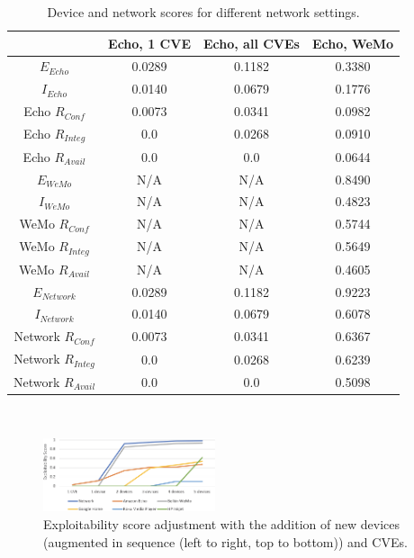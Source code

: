 \begin{table}[t]
    \centering
    \begin{tabular}{| c | c | c | c |}
    \toprule
    {} & Echo, 1 CVE & Echo, all CVEs & Echo, WeMo \\
    \midrule
    $E_{Echo}$ & 0.0289 & 0.1182 & 0.3380 \\
    $I_{Echo}$ & 0.0140 & 0.0679 & 0.1776 \\
    Echo $R_{Conf}$ & 0.0073 & 0.0341 & 0.0982 \\
    Echo $R_{Integ}$ & 0.0 & 0.0268 & 0.0910 \\
    Echo $R_{Avail}$ & 0.0 & 0.0 & 0.0644 \\
    \midrule
    $E_{WeMo}$ & N/A & N/A & 0.8490 \\
    $I_{WeMo}$ & N/A & N/A & 0.4823 \\
    WeMo $R_{Conf}$ & N/A & N/A & 0.5744 \\
    WeMo $R_{Integ}$ & N/A & N/A & 0.5649 \\
    WeMo $R_{Avail}$ & N/A & N/A & 0.4605 \\
    \midrule
    $E_{Network}$ & 0.0289 & 0.1182 & 0.9223 \\
    $I_{Network}$ & 0.0140 & 0.0679 & 0.6078 \\
    Network $R_{Conf}$ & 0.0073 & 0.0341 & 0.6367 \\
    Network $R_{Integ}$ & 0.0 & 0.0268 & 0.6239 \\
    Network $R_{Avail}$ & 0.0 & 0.0 & 0.5098 \\
    \bottomrule
    \end{tabular}
    \\
    \caption{Device and network scores for different network settings.}
    \label{tab:results}
\end{table}

\begin{figure}[t]
    \centering
    \includegraphics[width=0.45\textwidth]{exploitability_trends.png}
    \caption{Exploitability score adjustment with the addition of new devices (augmented in sequence (left to right, top to bottom)) and CVEs.}
    \label{fig:exploitability_trends}
\end{figure}

